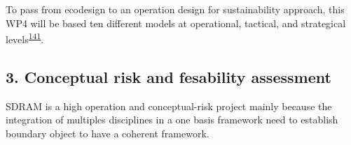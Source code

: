 \documentclass[
  12pt,
  a4paperpaper,
  onecolumn]{article}
\begin{document}
To pass from ecodesign to an operation design for sustainability
approach, this WP4 will be based ten different models at operational,
tactical, and strategical
levels\textsuperscript{\protect\hyperlink{ref-SousaRocha2019}{141}}.

\hypertarget{conceptual-risk-and-fesability-assessment}{%
\subsection{3. Conceptual risk and fesability
assessment}\label{conceptual-risk-and-fesability-assessment}}

SDRAM is a high operation and conceptual-risk project mainly because the
integration of multiples disciplines in a one basis framework need to
establish boundary object to have a coherent framework.

\small
\end{document}
